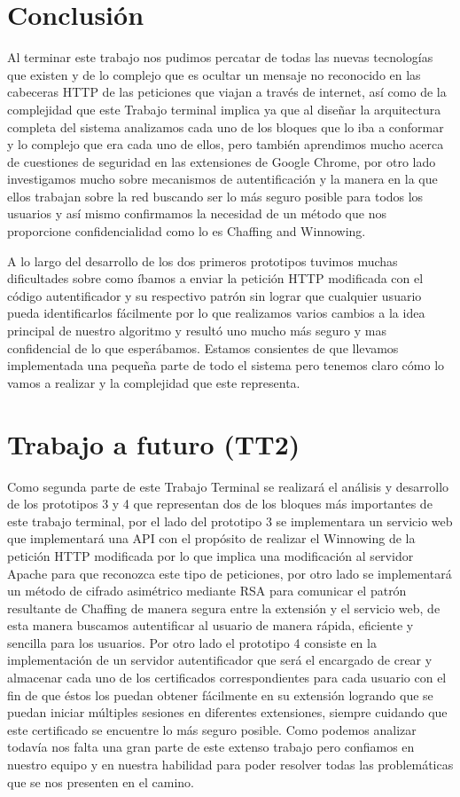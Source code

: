 \documentclass[12pt, a4paper, titlepage]{report}
\begin{document}
	\chapter{\textcolor{azulescom}{Conclusión}}
	Al terminar este trabajo nos pudimos percatar de todas las nuevas tecnologías que existen y de lo complejo que es ocultar un mensaje no reconocido en las cabeceras HTTP de las peticiones que viajan a través de internet, así como de la complejidad que este Trabajo terminal implica ya que al diseñar la arquitectura completa del sistema analizamos cada uno de los bloques que lo iba a conformar y lo complejo que era cada uno de ellos, pero también aprendimos mucho acerca de cuestiones de seguridad en las extensiones de Google Chrome, por otro lado investigamos mucho sobre mecanismos de autentificación y la manera en la que ellos trabajan sobre la red buscando ser lo más seguro posible para todos los usuarios y así mismo confirmamos la necesidad de un método que nos proporcione confidencialidad como lo es Chaffing and Winnowing.
	
	A lo largo del desarrollo de los dos primeros prototipos tuvimos muchas dificultades sobre como íbamos a enviar la petición HTTP modificada con el código autentificador y su respectivo patrón sin lograr que cualquier usuario pueda identificarlos fácilmente por lo que realizamos varios cambios a la idea principal de nuestro algoritmo y resultó uno mucho más seguro y mas confidencial de lo que esperábamos. Estamos consientes de que llevamos implementada una pequeña parte de todo el sistema pero tenemos claro cómo lo vamos a realizar y la complejidad que este representa.
	\chapter{\textcolor{azulescom}{Trabajo a futuro (TT2)}}
	Como segunda parte de este Trabajo Terminal se realizará el análisis y desarrollo de los prototipos 3 y 4 que representan dos de los bloques más importantes de este trabajo terminal, por el lado del prototipo 3 se implementara un servicio web que implementará una API con el propósito de realizar el Winnowing de la petición HTTP modificada por lo que implica una modificación al servidor Apache para que reconozca este tipo de peticiones, por otro lado se implementará un método de cifrado asimétrico mediante RSA para comunicar el patrón resultante de Chaffing de manera segura entre la extensión y el servicio web, de esta manera buscamos autentificar al usuario de manera rápida, eficiente y sencilla para los usuarios. Por otro lado el prototipo 4 consiste en la implementación de un servidor autentificador que será el encargado de crear y  almacenar cada uno de los certificados correspondientes para cada usuario con el fin de que éstos los puedan obtener fácilmente en su extensión logrando que se puedan iniciar múltiples sesiones en diferentes extensiones, siempre cuidando que este certificado se encuentre lo más seguro posible.
	Como podemos analizar todavía nos falta una gran parte de este extenso trabajo pero confiamos en nuestro equipo y en nuestra habilidad para poder resolver todas las problemáticas que se nos presenten en el camino.
	\newpage
    
\end{document}
